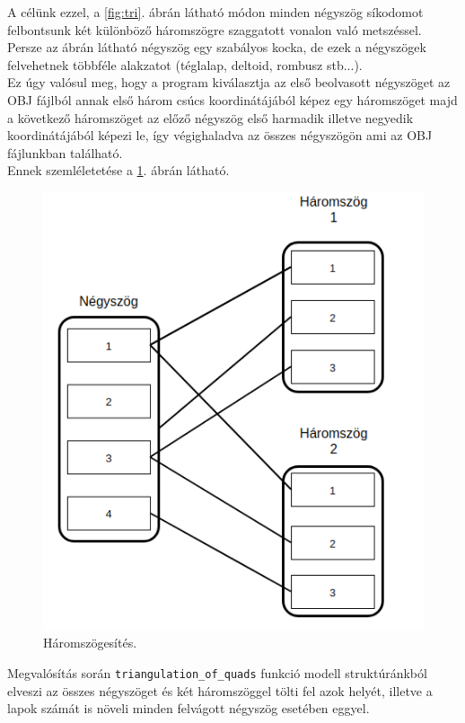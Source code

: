 \noindent A célünk ezzel, a \ref{fig:tri}. ábrán  látható módon minden négyszög síkodomot felbontsunk két különböző háromszögre szaggatott vonalon való metszéssel. Persze az ábrán látható négyszög egy szabályos kocka, de ezek a négyszögek felvehetnek többféle alakzatot (téglalap, deltoid, rombusz stb...).\\

Ez úgy valósul meg, hogy a program kiválasztja az első beolvasott négyszöget az OBJ fájlból annak első három csúcs koordinátájából képez egy háromszöget majd a következő háromszöget az előző négyszög első harmadik illetve negyedik koordinátájából képezi le, így végighaladva az összes négyszögön ami az OBJ fájlunkban található.\\Ennek szemléletetése a \ref{fig:tri1}. ábrán látható.
\begin{figure}[h]
\centering
\includegraphics[scale=0.39]{images/haromszog.png}
\caption{Háromszögesítés.}
\label{fig:tri1}
\end{figure}

Megvalósítás során \texttt{triangulation\_of\_quads} funkció modell struktúránkból elveszi az összes négyszöget és két háromszöggel tölti fel azok helyét, illetve a lapok számát is növeli minden felvágott négyszög esetében eggyel.

